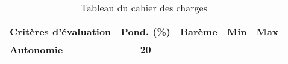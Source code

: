 

\begin{table}[htp]
	\caption{Tableau du cahier des charges}
	\label{t:cdc_tab}
	\centering
	\begin{tabular}{|l|c|c|c|c|}
		\hline\hline
		Critères d’évaluation & Pond. (\%) & Barème & Min & Max\\
		\hline
		\hline
		\textbf{Autonomie} & \textbf{20} & & & \\
		
		\hline
		\hline
	\end{tabular}
	
\end{table}